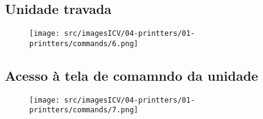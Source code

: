 \subsection{Unidade travada}
\begin{figure}
    \centering
    \texttt{[image: src/imagesICV/04-printters/01-printters/commands/6.png]}
\end{figure}
\newpage
\thispagestyle{fancy}
\vspace{\fill}

\subsection{Acesso à tela de comamndo da unidade}
\begin{figure}
    \centering
    \texttt{[image: src/imagesICV/04-printters/01-printters/commands/7.png]}
\end{figure}


